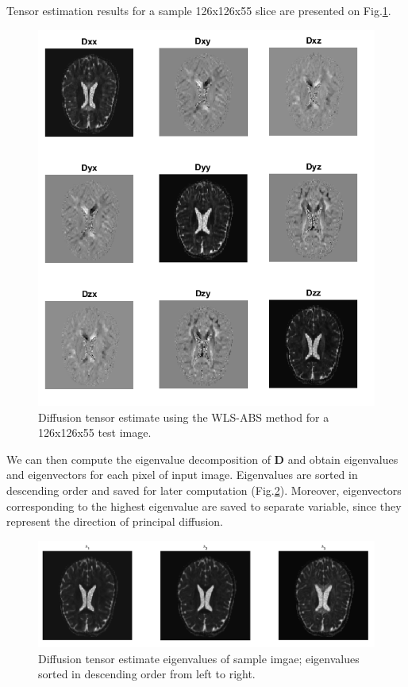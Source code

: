 Tensor estimation results for a sample 126x126x55 slice are presented on Fig.\ref{fig:m6_pic_2}.

\begin{figure}[H]
	\includegraphics[width=12cm]{figures/Module_06/tensor_image}
	\centering
	\caption{Diffusion tensor estimate using the WLS-ABS method for a 126x126x55 test image.}
	\label{fig:m6_pic_2}
\end{figure}

We can then compute the eigenvalue decomposition of $\boldsymbol{D}$ and obtain eigenvalues and eigenvectors for each pixel of input image. Eigenvalues are sorted in descending order and saved for later computation (Fig.\ref{fig:m6_pic_3}). Moreover, eigenvectors corresponding to the highest eigenvalue are saved to separate variable, since they represent the direction of principal diffusion.

\begin{figure}[H]
	\includegraphics[width=12cm]{figures/Module_06/eig_image}
	\centering
	\caption{Diffusion tensor estimate eigenvalues of sample imgae; eigenvalues sorted in descending order from left to right.}
	\label{fig:m6_pic_3}
\end{figure}

